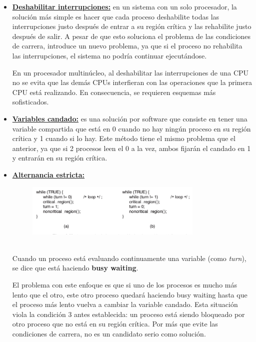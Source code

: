 \begin{itemize}
\item \textbf{\underline{Deshabilitar interrupciones:}} en un sistema con un solo procesador, la solución más simple es hacer que cada proceso deshabilite todas las interrupciones justo después de entrar a su región crítica y las rehabilite justo después de salir. A pesar de que esto soluciona el problema de las condiciones de carrera, introduce un nuevo problema, ya que si el proceso no rehabilita las interrupciones, el sistema no podría continuar ejecutándose.

En un procesador multinúcleo, al deshabilitar las interrupciones de una CPU no se evita que las demás CPUs interfieran con las operaciones que la primera CPU está realizando. En consecuencia, se requieren esquemas más sofisticados.

\item \textbf{\underline{Variables candado:}} es una solución por software que consiste en tener una variable compartida que está en 0 cuando no hay ningún proceso en su región crítica y 1 cuando si lo hay. Este método tiene el mismo problema que el anterior, ya que si 2 procesos leen el 0 a la vez, ambos fijarán el candado en 1 y entrarán en su región crítica.

\item \textbf{\underline{Alternancia estricta:}}
~\\
\begin{figure}[h]
	\begin{center}
	\includegraphics[width=0.8\textwidth]{imagenes/alternancia-estricta.jpg}
	\end{center}
\end{figure}
~\\

Cuando un proceso está evaluando continuamente una variable (como \textit{turn}), se dice que está haciendo \textbf{busy waiting}.

El problema con este enfoque es que si uno de los procesos es mucho más lento que el otro, este otro proceso quedará haciendo busy waiting hasta que el proceso más lento vuelva a cambiar la variable candado. Esta situación viola la condición 3 antes establecida: un proceso está siendo bloqueado por otro proceso que no está en su región crítica. Por más que evite las condiciones de carrera, no es un candidato serio como solución.
~\\


\end{itemize}
